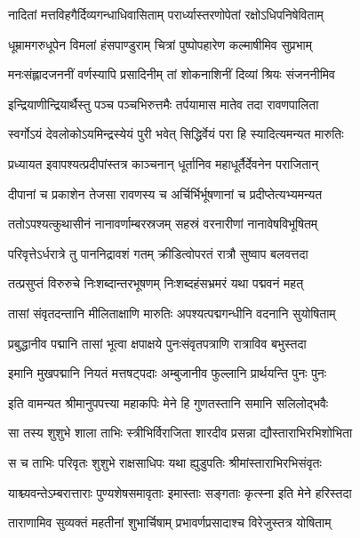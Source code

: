 \twolineshloka
{नादितां मत्तविहगैर्दिव्यगन्धाधिवासिताम्}
{परार्ध्यास्तरणोपेतां रक्षोऽधिपनिषेविताम्} %

\twolineshloka
{धूम्रामगरुधूपेन विमलां हंसपाण्डुराम्}
{चित्रां पुष्पोपहारेण कल्माषीमिव सुप्रभाम्} %

\twolineshloka
{मनःसंह्लादजननीं वर्णस्यापि प्रसादिनीम्}
{तां शोकनाशिनीं दिव्यां श्रियः संजननीमिव} %

\twolineshloka
{इन्द्रियाणीन्द्रियार्थैस्तु पञ्च पञ्चभिरुत्तमैः}
{तर्पयामास मातेव तदा रावणपालिता} %

\twolineshloka
{स्वर्गोऽयं देवलोकोऽयमिन्द्रस्येयं पुरी भवेत्}
{सिद्धिर्वेयं परा हि स्यादित्यमन्यत मारुतिः} %

\twolineshloka
{प्रध्यायत इवापश्यत्प्रदीपांस्तत्र काञ्चनान्}
{धूर्तानिव महाधूर्तैर्देवनेन पराजितान्} %

\twolineshloka
{दीपानां च प्रकाशेन तेजसा रावणस्य च}
{अर्चिर्भिर्भूषणानां च प्रदीप्तेत्यभ्यमन्यत} %

\twolineshloka
{ततोऽपश्यत्कुथासीनं नानावर्णाम्बरस्रजम्}
{सहस्रं वरनारीणां नानावेषविभूषितम्} %

\twolineshloka
{परिवृत्तेऽर्धरात्रे तु पाननिद्रावशं गतम्}
{क्रीडित्वोपरतं रात्रौ सुष्वाप बलवत्तदा} %

\twolineshloka
{तत्प्रसुप्तं विरुरुचे निःशब्दान्तरभूषणम्}
{निःशब्दहंसभ्रमरं यथा पद्मवनं महत्} %

\twolineshloka
{तासां संवृतदन्तानि मीलिताक्षाणि मारुतिः}
{अपश्यत्पद्मगन्धीनि वदनानि सुयोषिताम्} %

\twolineshloka
{प्रबुद्धानीव पद्मानि तासां भूत्वा क्षपाक्षये}
{पुनःसंवृतपत्राणि रात्राविव बभुस्तदा} %

\twolineshloka
{इमानि मुखपद्मानि नियतं मत्तषट्पदाः}
{अम्बुजानीव फुल्लानि प्रार्थयन्ति पुनः पुनः} %

\twolineshloka
{इति वामन्यत श्रीमानुपपत्त्या महाकपिः}
{मेने हि गुणतस्तानि समानि सलिलोद्भवैः} %

\twolineshloka
{सा तस्य शुशुभे शाला ताभिः स्त्रीभिर्विराजिता}
{शारदीव प्रसन्ना द्यौस्ताराभिरभिशोभिता} %

\twolineshloka
{स च ताभिः परिवृतः शुशुभे राक्षसाधिपः}
{यथा ह्युडुपतिः श्रीमांस्ताराभिरभिसंवृतः} %

\twolineshloka
{याश्च्यवन्तेऽम्बरात्ताराः पुण्यशेषसमावृताः}
{इमास्ताः सङ्गताः कृत्स्ना इति मेने हरिस्तदा} %

\twolineshloka
{ताराणामिव सुव्यक्तं महतीनां शुभार्चिषाम्}
{प्रभावर्णप्रसादाश्च विरेजुस्तत्र योषिताम्} %

